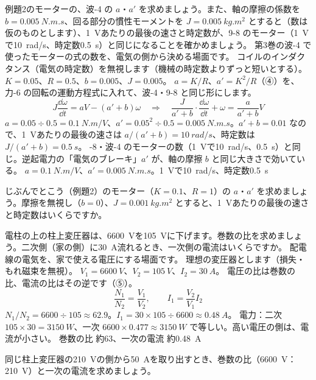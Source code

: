 \label{ph:電-12:ex4}
\begin{phreidai}[波-4 の $a$・$a'$ と、9-8 のモーター]
例題2のモーターの、波-4 の $a$・$a'$ を求めましょう。また、軸の摩擦の係数を $b=\qty{0.005}{N.m.s}$、回る部分の慣性モーメントを $J=\qty{0.005}{kg.m^2}$ とすると（数は仮のものとします）、\qty{1}{V}あたりの最後の速さと時定数が、9-8 のモーター（\qty{1}{V}で\qty{10}{rad/s}、時定数\qty{0.5}{s}）と同じになることを確かめましょう。
\phbamen
第3巻の波-4 で使ったモーターの式の数を、電気の側から決める場面です。
\phmushi
コイルのインダクタンス（電気の時定数）を無視します（機械の時定数よりずっと短いとする）。
\phzu
$K=0.05$、$R=0.5$、$b=0.005$、$J=0.005$。
\phriyu
$a=K/R$、$a'=K^2/R$（④）を、力-6 の回転の運動方程式に入れて、波-4・9-8 と同じ形にします。
\phtateru
\[J\frac{\dd\omega}{\dd t}=aV-(a'+b)\omega\quad\Longrightarrow\quad \frac{J}{a'+b}\cdot\frac{\dd\omega}{\dd t}+\omega=\frac{a}{a'+b}V\]
\phtoku
$a=0.05\div0.5=\qty{0.1}{N.m/V}$、$a'=0.05^2\div0.5=\qty{0.005}{N.m.s}$。$a'+b=0.01$ なので、\qty{1}{V}あたりの最後の速さは $a/(a'+b)=\qty{10}{rad/s}$、時定数は $J/(a'+b)=\qty{0.5}{s}$。
-8・波-4 のモーターの数（\qty{1}{V}で\qty{10}{rad/s}、\qty{0.5}{s}）と同じ。逆起電力の「電気のブレーキ」$a'$ が、軸の摩擦 $b$ と同じ大きさで効いている。
\kotae $a=\qty{0.1}{N.m/V}$、$a'=\qty{0.005}{N.m.s}$。\qty{1}{V}で\qty{10}{rad/s}、時定数\qty{0.5}{s}
\end{phreidai}
\begin{jibun}
じぶんでとこう（例題2）のモーター（$K=0.1$、$R=1$）の $a$・$a'$ を求めましょう。摩擦を無視し（$b=0$）、$J=\qty{0.001}{kg.m^2}$ とすると、\qty{1}{V}あたりの最後の速さと時定数はいくらですか。
\end{jibun}

\label{ph:電-12:ex5}
\begin{phreidai}[柱上変圧器]
電柱の上の柱上変圧器は、\qty{6600}{V}を\qty{105}{V}に下げます。巻数の比を求めましょう。二次側（家の側）に\qty{30}{A}流れるとき、一次側の電流はいくらですか。
\phbamen
配電線の電気を、家で使える電圧にする場面です。
\phmushi
理想の変圧器とします（損失・もれ磁束を無視）。
\phzu
$V_1=\qty{6600}{V}$、$V_2=\qty{105}{V}$、$I_2=\qty{30}{A}$。
\phriyu
電圧の比は巻数の比、電流の比はその逆です（⑤）。
\phtateru
\[\frac{N_1}{N_2}=\frac{V_1}{V_2},\qquad I_1=\frac{V_2}{V_1}I_2\]
\phtoku
$N_1/N_2=6600\div105\approx62.9$。$I_1=30\times105\div6600\approx\qty{0.48}{A}$。
\phtashikame
電力：二次 $105\times30=\qty{3150}{W}$、一次 $6600\times0.477\approx\qty{3150}{W}$ で等しい。高い電圧の側は、電流が小さい。
\kotae 巻数の比 約63、一次の電流 約\qty{0.48}{A}
\end{phreidai}
\begin{jibun}
同じ柱上変圧器の\qty{210}{V}の側から\qty{50}{A}を取り出すとき、巻数の比（\qty{6600}{V}：\qty{210}{V}）と一次の電流を求めましょう。
\end{jibun}

